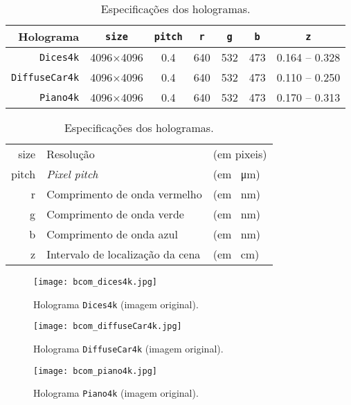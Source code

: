 \begin{table}[!htbp]
    \centering
    \caption{Especificações dos hologramas.}
    \label{tab:holo-specs}
    \begin{tabular}{r c c c c c c}
        \toprule
        Holograma & \verb|size| & \verb|pitch| & \verb|r| & \verb|g| & \verb|b| & \verb|z| \\
        \midrule
        \texttt{Dices4k} & 4096$\times$4096 & \SI{0.4}{} & \SI{640}{} & \SI{532}{} & \SI{473}{} & \SI{0.164}{} -- \SI{0.328}{} \\
        \texttt{DiffuseCar4k} & 4096$\times$4096 & \SI{0.4}{} & \SI{640}{} & \SI{532}{} & \SI{473}{} & \SI{0.110}{} -- \SI{0.250}{} \\
        \texttt{Piano4k} & 4096$\times$4096 & \SI{0.4}{} & \SI{640}{} & \SI{532}{} & \SI{473}{} & \SI{0.170}{} -- \SI{0.313}{} \\
        \bottomrule
    \end{tabular}
    \subcaption*{}
    \begin{tabular}{>{\ttfamily}r @{~:~~} l l}
        size & Resolução & (em pixeis) \\
        pitch & \textit{Pixel pitch} & (em \SI{}{\micro\meter}) \\
        r & Comprimento de onda vermelho & (em \SI{}{\nano\meter}) \\
        g & Comprimento de onda verde & (em \SI{}{\nano\meter}) \\
        b & Comprimento de onda azul & (em \SI{}{\nano\meter}) \\
        z & Intervalo de localização da cena & (em \SI{}{\centi\meter}) \\
    \end{tabular}
\end{table}



\begin{figure}
    \centering
    \texttt{[image: bcom\_dices4k.jpg]}
    \caption{Holograma \texttt{Dices4k} (imagem original).}
    \label{fig:bcom_dices4k}
\end{figure}

\begin{figure}
    \centering
    \texttt{[image: bcom\_diffuseCar4k.jpg]}
    \caption{Holograma \texttt{DiffuseCar4k} (imagem original).}
    \label{fig:bcom_diffuseCar4k}
\end{figure}

\begin{figure}
    \centering
    \texttt{[image: bcom\_piano4k.jpg]}
    \caption{Holograma \texttt{Piano4k} (imagem original).}
    \label{fig:bcom_piano4k}
\end{figure}


